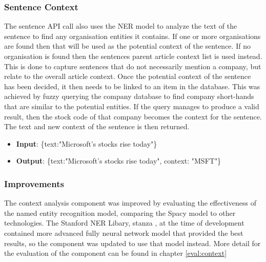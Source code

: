          
            \subsubsection{Sentence Context}
            The sentence API call also uses the NER model to analyze the text of the sentence to find any organisation entities it contains. If one or more organisations are found then that will be used as the potential context of the sentence. If no organisation is found then the sentences parent article context list is used instead. This is done to capture sentences that do not necessarily mention a company, but relate to the overall article context. Once the potential context of the sentence has been decided, it then needs to be linked to an item in the database. This was achieved by fuzzy querying the company database to find company short-hands that are similar to the potential entities. If the query manages to produce a valid result, then the stock code of that company becomes the context for the sentence. The text and new context of the sentence is then returned.
            
            \begin{itemize}
                \item \textbf{Input}: \{text:"Microsoft's stocks rise today"\}
                \item \textbf{Output}: \{text:"Microsoft's stocks rise today", context: "MSFT"\}
            \end{itemize}
            
            \subsubsection{Improvements}
            The context analysis component was improved by evaluating the effectiveness of the named entity recognition model, comparing the Spacy model to other technologies. The Stanford NER Libary, stanza \citep{technology:Stanza}, at the time of development contained more advanced fully neural network model that provided the best results, so the component was updated to use that model instead. More detail for the evaluation of the component can be found in chapter \ref{eval:context}
            
            
